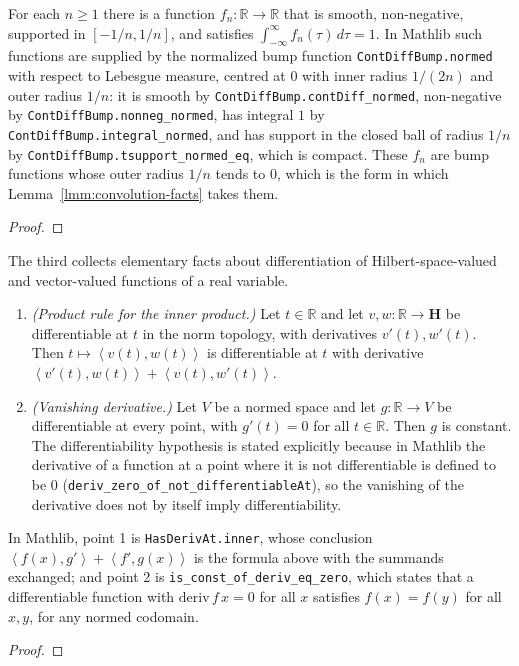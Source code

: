\begin{lemma}
    \label{lmm:smooth-approximate-identity}
    \leanok
    For each $n \ge 1$ there is a function $f_n : \mathbb{R} \rightarrow \mathbb{R}$ that is smooth, non-negative, supported in $[-1/n, 1/n]$, and satisfies $\int_{-\infty}^{\infty} f_n(\tau) \, d\tau = 1$.
    In Mathlib such functions are supplied by the normalized bump function \texttt{ContDiffBump.normed} with respect to Lebesgue measure, centred at $0$ with inner radius $1/(2n)$ and outer radius $1/n$: it is smooth by \texttt{ContDiffBump.contDiff\_normed}, non-negative by \texttt{ContDiffBump.nonneg\_normed}, has integral $1$ by \texttt{ContDiffBump.integral\_normed}, and has support in the closed ball of radius $1/n$ by \texttt{ContDiffBump.tsupport\_normed\_eq}, which is compact. These $f_n$ are bump functions whose outer radius $1/n$ tends to $0$, which is the form in which Lemma~\ref{lmm:convolution-facts} takes them.
\end{lemma}
\begin{proof}
\leanok
\end{proof}

The third collects elementary facts about differentiation of Hilbert-space-valued and vector-valued functions of a real variable.

\begin{proposition}
    \label{prpstn:calculus-facts}
    \leanok
    \begin{enumerate}
        \item \textit{(Product rule for the inner product.)} Let $t \in \mathbb{R}$ and let $v, w : \mathbb{R} \rightarrow \mathbf{H}$ be differentiable at $t$ in the norm topology, with derivatives $v'(t), w'(t)$. Then $t \mapsto \left< v(t), w(t) \right>$ is differentiable at $t$ with derivative $\left< v'(t), w(t) \right> + \left< v(t), w'(t) \right>$.
        \item \textit{(Vanishing derivative.)} Let $V$ be a normed space and let $g : \mathbb{R} \rightarrow V$ be differentiable at every point, with $g'(t) = 0$ for all $t \in \mathbb{R}$. Then $g$ is constant. The differentiability hypothesis is stated explicitly because in Mathlib the derivative of a function at a point where it is not differentiable is defined to be $0$ (\texttt{deriv\_zero\_of\_not\_differentiableAt}), so the vanishing of the derivative does not by itself imply differentiability.
    \end{enumerate}
    In Mathlib, point 1 is \texttt{HasDerivAt.inner}, whose conclusion $\left< f(x), g' \right> + \left< f', g(x) \right>$ is the formula above with the summands exchanged; and point 2 is \texttt{is\_const\_of\_deriv\_eq\_zero}, which states that a differentiable function with $\text{deriv}\, f\, x = 0$ for all $x$ satisfies $f(x) = f(y)$ for all $x, y$, for any normed codomain.
\end{proposition}
\begin{proof}
\leanok
\end{proof}

